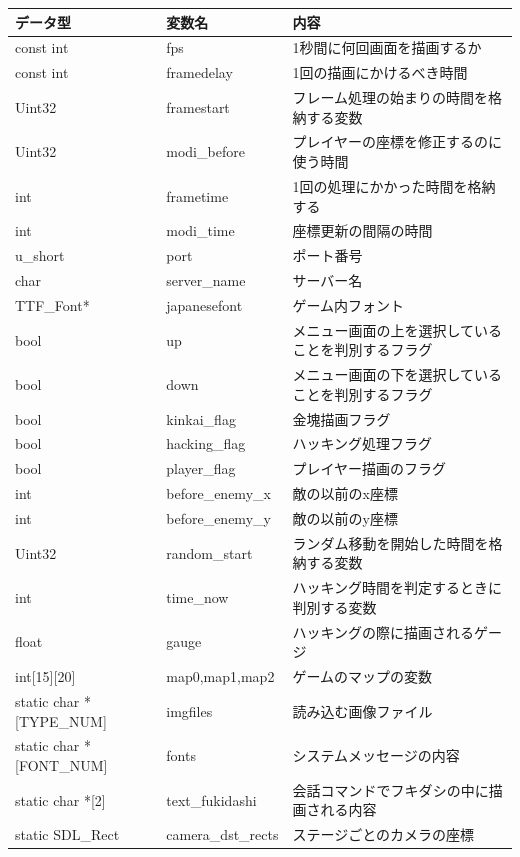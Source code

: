 \documentclass{jarticle}
\begin{document}
\begin{table}[H]
\begin{tabular}{|p{13em}|p{13em}|p{12em}|}
    \hline
    データ型 & 変数名 & 内容 \\ \hline
    const int & fps & 1秒間に何回画面を描画するか \\
    const int & framedelay & 1回の描画にかけるべき時間 \\
    Uint32 & framestart & フレーム処理の始まりの時間を格納する変数 \\
    Uint32 & modi\_before & プレイヤーの座標を修正するのに使う時間 \\
    int & frametime & 1回の処理にかかった時間を格納する \\
    int & modi\_time & 座標更新の間隔の時間 \\
    u\_short & port & ポート番号 \\
    char & server\_name & サーバー名 \\
    TTF\_Font* & japanesefont & ゲーム内フォント \\
    bool & up &  メニュー画面の上を選択していることを判別するフラグ \\
    bool & down &メニュー画面の下を選択していることを判別するフラグ\\
    bool & kinkai\_flag & 金塊描画フラグ \\
    bool & hacking\_flag & ハッキング処理フラグ \\
    bool & player\_flag & プレイヤー描画のフラグ\\
    int & before\_enemy\_x & 敵の以前のx座標 \\
    int & before\_enemy\_y & 敵の以前のy座標 \\
    Uint32 & random\_start & ランダム移動を開始した時間を格納する変数 \\  
    int & time\_now & ハッキング時間を判定するときに判別する変数 \\
    float & gauge & ハッキングの際に描画されるゲージ \\
    int[15][20] & map0,map1,map2 & ゲームのマップの変数 \\
    static char *[TYPE\_NUM] & imgfiles & 読み込む画像ファイル \\
    static char *[FONT\_NUM] & fonts & システムメッセージの内容 \\
    static char *[2]& text\_fukidashi & 会話コマンドでフキダシの中に描画される内容 \\
    static SDL\_Rect & camera\_dst\_rects & ステージごとのカメラの座標\\ 

\end{tabular}
\end{table}
\end{document}
